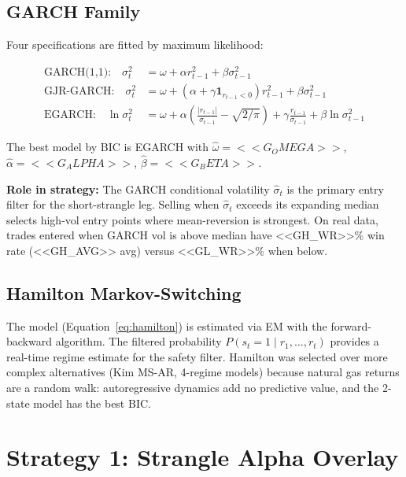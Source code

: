 \documentclass[11pt,a4paper]{article}
\begin{document}
\subsection{GARCH Family}

Four specifications are fitted by maximum likelihood:

\begin{align}
\text{GARCH(1,1):} \quad \sigma_t^2 &= \omega + \alpha r_{t-1}^2 + \beta \sigma_{t-1}^2 \label{eq:garch} \\
\text{GJR-GARCH:} \quad \sigma_t^2 &= \omega + (\alpha + \gamma \mathbf{1}_{r_{t-1}<0}) r_{t-1}^2 + \beta \sigma_{t-1}^2 \label{eq:gjr} \\
\text{EGARCH:} \quad \ln \sigma_t^2 &= \omega + \alpha \left(\frac{|r_{t-1}|}{\sigma_{t-1}} - \sqrt{2/\pi}\right) + \gamma \frac{r_{t-1}}{\sigma_{t-1}} + \beta \ln \sigma_{t-1}^2 \label{eq:egarch}
\end{align}

The best model by BIC is EGARCH with $\hat{\omega} = <<G_OMEGA>>$, $\hat{\alpha} = <<G_ALPHA>>$, $\hat{\beta} = <<G_BETA>>$.

\textbf{Role in strategy:} The GARCH conditional volatility $\hat{\sigma}_t$ is the primary entry filter for the short-strangle leg. Selling when $\hat{\sigma}_t$ exceeds its expanding median selects high-vol entry points where mean-reversion is strongest. On real data, trades entered when GARCH vol is above median have <<GH_WR>>\% win rate (<<GH_AVG>> avg) versus <<GL_WR>>\% when below.

\subsection{Hamilton Markov-Switching}

The model (Equation~\ref{eq:hamilton}) is estimated via EM with the forward-backward algorithm. The filtered probability $P(s_t = 1 \mid r_1, \ldots, r_t)$ provides a real-time regime estimate for the safety filter. Hamilton was selected over more complex alternatives (Kim MS-AR, 4-regime models) because natural gas returns are a random walk: autoregressive dynamics add no predictive value, and the 2-state model has the best BIC.


\section{Strategy 1: Strangle Alpha Overlay}
\label{sec:strat1}
\end{document}
